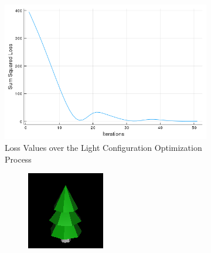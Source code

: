 \documentclass{juliacon}
\begin{document}
\begin{figure}[!htb]
    \centering
    \begin{subfigure}[c]{0.45\textwidth}
        \includegraphics[width=\linewidth]{images/light/loss_plot_light.png}
        \caption{Loss Values over the Light Configuration Optimization Process}
        \label{fig:loss_plot_light}
    \end{subfigure}
    \hfill
    \begin{subfigure}[c]{0.45\textwidth}
        \begin{subfigure}[c]{0.45\textwidth}
            \centering
            \includegraphics[width=\textwidth]{images/light/original.png}

\end{subfigure}
\end{subfigure}
\end{figure}
\end{document}
